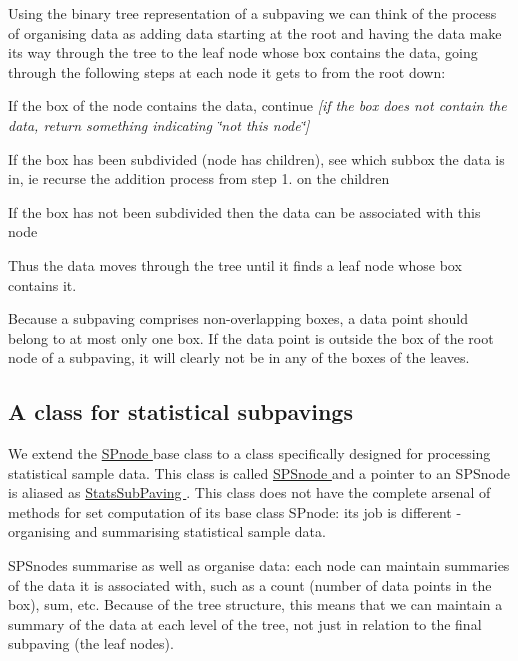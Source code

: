 \-Using the binary tree representation of a subpaving we can think of the process of organising data as adding data starting at the root and having the data make its way through the tree to the leaf node whose box contains the data, going through the following steps at each node it gets to from the root down\-:


\begin{DoxyEnumerate}
\item \-If the box of the node contains the data, continue {\itshape \mbox{[}if the box does not contain the data, return something indicating \char`\"{}not this node\char`\"{}\mbox{]}\/} 
\item \-If the box has been subdivided (node has children), see which subbox the data is in, ie recurse the addition process from step 1. on the children 
\item \-If the box has not been subdivided then the data can be associated with this node 
\end{DoxyEnumerate}

\-Thus the data moves through the tree until it finds a leaf node whose box contains it.

\-Because a subpaving comprises non-\/overlapping boxes, a data point should belong to at most only one box. \-If the data point is outside the box of the root node of a subpaving, it will clearly not be in any of the boxes of the leaves.



\hypertarget{StatsSubPavings_statssec_statsclass}{}\subsection{\-A class for statistical subpavings}\label{StatsSubPavings_statssec_statsclass}
\-We extend the \hyperlink{classsubpavings_1_1SPnode}{\-S\-Pnode } base class to a class specifically designed for processing statistical sample data. \-This class is called \hyperlink{classsubpavings_1_1SPSnode}{\-S\-P\-Snode } and a pointer to an \-S\-P\-Snode is aliased as \hyperlink{namespacesubpavings_ace6b16f0adf0db13eeb38e124d5328c6}{\-Stats\-Sub\-Paving }. \-This class does not have the complete arsenal of methods for set computation of its base class \-S\-Pnode\-: its job is different -\/ organising and summarising statistical sample data.

\-S\-P\-Snodes summarise as well as organise data\-: each node can maintain summaries of the data it is associated with, such as a count (number of data points in the box), sum, etc. \-Because of the tree structure, this means that we can maintain a summary of the data at each level of the tree, not just in relation to the final subpaving (the leaf nodes).

